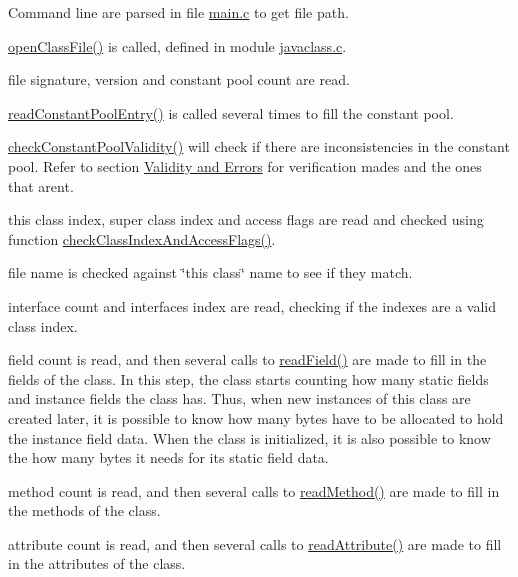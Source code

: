 \begin{DoxyEnumerate}
\item Command line are parsed in file \hyperlink{main_8c}{main.\+c} to get file path.
\item \hyperlink{javaclass_8c_ae447cd0966dc3beb54467b9097e08f2c}{open\+Class\+File()} is called, defined in module \hyperlink{javaclass_8c}{javaclass.\+c}.
\item file signature, version and constant pool count are read.
\item \hyperlink{constantpool_8c_a62504539fde83f5183d20f262d4b1943}{read\+Constant\+Pool\+Entry()} is called several times to fill the constant pool.
\item \hyperlink{validity_8c_aa0977a766bc0cd47a49ca0e00e706310}{check\+Constant\+Pool\+Validity()} will check if there are inconsistencies in the constant pool. Refer to section \hyperlink{index_validity}{Validity and Errors} for verification mades and the ones that aren\textquotesingle{}t.
\item this class index, super class index and access flags are read and checked using function \hyperlink{validity_8c_a3f8d1665f8c40afb0bf126a9ca693b00}{check\+Class\+Index\+And\+Access\+Flags()}.
\item file name is checked against \char`\"{}this class\char`\"{} name to see if they match.
\item interface count and interfaces\textquotesingle{} index are read, checking if the indexes are a valid class index.
\item field count is read, and then several calls to \hyperlink{fields_8c_a5f94d9f571277dfd4d401b69ee8ce0f1}{read\+Field()} are made to fill in the fields of the class. In this step, the class starts counting how many static fields and instance fields the class has. Thus, when new instances of this class are created later, it is possible to know how many bytes have to be allocated to hold the instance field data. When the class is initialized, it is also possible to know the how many bytes it needs for its static field data.
\item method count is read, and then several calls to \hyperlink{methods_8c_a0ee1df02a4ba0b51f9e6db74bef74ac9}{read\+Method()} are made to fill in the methods of the class.
\item attribute count is read, and then several calls to \hyperlink{attributes_8c_a0aab7731ade76c16c2ff8b3bef1111d1}{read\+Attribute()} are made to fill in the attributes of the class.
\end{DoxyEnumerate}

